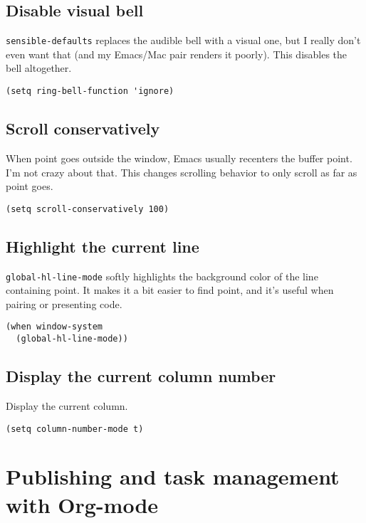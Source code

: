 \documentclass[11pt]{article}
\begin{document}
\subsection{Disable visual bell}
\label{sec:org43ed115}

\texttt{sensible-defaults} replaces the audible bell with a visual one, but I really
don't even want that (and my Emacs/Mac pair renders it poorly). This disables
the bell altogether.

\begin{verbatim}
(setq ring-bell-function 'ignore)
\end{verbatim}

\subsection{Scroll conservatively}
\label{sec:orgb46e03c}

When point goes outside the window, Emacs usually recenters the buffer point.
I'm not crazy about that. This changes scrolling behavior to only scroll as far
as point goes.

\begin{verbatim}
(setq scroll-conservatively 100)
\end{verbatim}
\subsection{Highlight the current line}
\label{sec:org32f599b}

\texttt{global-hl-line-mode} softly highlights the background color of the line
containing point. It makes it a bit easier to find point, and it's useful when
pairing or presenting code.

\begin{verbatim}
(when window-system
  (global-hl-line-mode))
\end{verbatim}
\subsection{Display the current column number}
\label{sec:org2e7a0f1}

Display the current column.

\begin{verbatim}
(setq column-number-mode t)
\end{verbatim}

\section{Publishing and task management with Org-mode}
\label{sec:org5ff7c99}
\end{document}
